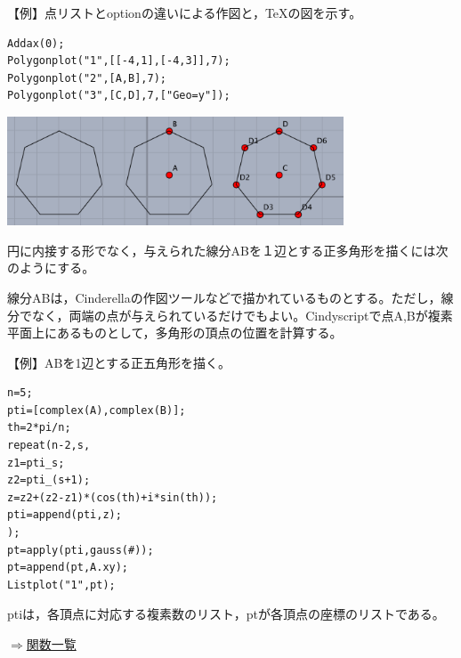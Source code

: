 \documentclass[papersize,a4paper,12pt,uplatex]{jsarticle}
\begin{document}
\begin{description}
\vspace{\baselineskip}
【例】点リストとoptionの違いによる作図と，TeXの図を示す。

\begin{verbatim}
Addax(0);
Polygonplot("1",[[-4,1],[-4,3]],7);
Polygonplot("2",[A,B],7);
Polygonplot("3",[C,D],7,["Geo=y"]);
\end{verbatim}

\hspace{10mm}\includegraphics[bb=0.00 0.00 541.03 175.01,width=10cm]{Fig/polygonplot2.pdf}

\hspace{10mm}


円に内接する形でなく，与えられた線分ABを１辺とする正多角形を描くには次のようにする。

線分ABは，Cinderellaの作図ツールなどで描かれているものとする。ただし，線分でなく，両端の点が与えられているだけでもよい。Cindyscriptで点A,Bが複素平面上にあるものとして，多角形の頂点の位置を計算する。

\vspace{\baselineskip}
【例】ABを1辺とする正五角形を描く。

\begin{verbatim}
n=5;
pti=[complex(A),complex(B)];
th=2*pi/n;
repeat(n-2,s,
z1=pti_s;
z2=pti_(s+1);
z=z2+(z2-z1)*(cos(th)+i*sin(th));
pti=append(pti,z);
);
pt=apply(pti,gauss(#));
pt=append(pt,A.xy);
Listplot("1",pt);
\end{verbatim}
ptiは，各頂点に対応する複素数のリスト，ptが各頂点の座標のリストである。 

\begin{flushright}\hyperlink{functionlist}{$\Rightarrow$関数一覧}\end{flushright}

\end{description}

\end{document}
